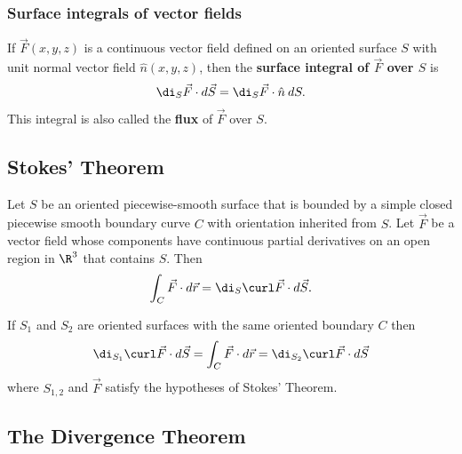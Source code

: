 \documentclass{article}
\begin{document}
\subsubsection{Surface integrals of vector fields}

\begin{definition}
	If $\vec F(x,y,z)$ is a continuous vector field defined on an oriented surface $S$ with
	unit normal vector field $\hat n(x,y,z)$, then the \textbf{surface integral of $\vec F$ over
		$S$} is
	\begin{align*}
		\di_S \vec F\cdot d\vec S = \di_S \vec F\cdot \hat n\:dS.
	\end{align*}
	This integral is also called the \textbf{flux} of $\vec F$ over $S$.
\end{definition}


\subsection{Stokes' Theorem}

\begin{theorem}
	Let $S$ be an oriented piecewise-smooth surface that is bounded by a simple closed
	piecewise smooth boundary curve $C$ with orientation inherited from $S$. Let $\vec F$
	be a vector field whose components have continuous partial derivatives on an open
	region in $\R^3$ that contains $S$. Then
	\begin{align*}
		\int_C \vec F\cdot d\vec r = \di_S \curl \vec F\cdot d\vec S.
	\end{align*}
\end{theorem}
\begin{corollary}
	If $S_1$ and $S_2$ are oriented surfaces with the same oriented boundary $C$ then
	\begin{align*}
		\di_{S_1}\curl \vec F\cdot d\vec S = \int_C \vec F\cdot d\vec r = \di_{S_2} \curl\vec F\cdot d\vec S
	\end{align*}
	where $S_{1,2}$ and $\vec F$ satisfy the hypotheses of Stokes' Theorem.
\end{corollary}


\subsection{The Divergence Theorem}
\end{document}
